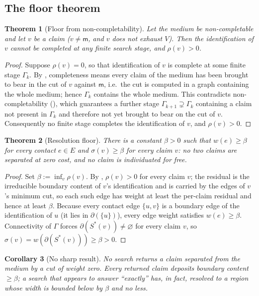 \documentclass[11pt,twocolumn,a4paper]{article}
\theoremstyle{thmstyle}
\newtheorem{theorem}{Theorem}[section]
\newtheorem{corollary}[theorem]{Corollary}
\theoremstyle{definition}
\theoremstyle{remark}
\newcommand{\Gph}{\Gamma}
\newcommand{\V}{V}
\newcommand{\E}{E}
\newcommand{\wt}{w}
\newcommand{\med}{\mathsf{m}}
\newcommand{\flo}{\beta}
\newcommand{\cut}{\partial}
\newcommand{\res}{\rho}
\newcommand{\str}{\sigma}
\begin{document}
\subsection{The floor theorem}

\begin{theorem}[Floor from non-completability]
\label{thm:floor-derived}
Let the medium be non-completable and let $v$ be a claim ($v\neq\med$, and
$v$ does not exhaust $\V$). Then the identification of $v$ cannot be
completed at any finite search stage, and $\res(v)>0$.
\end{theorem}

\begin{proof}
Suppose $\res(v)=0$, so that identification of $v$ is complete at some
finite stage $\Gph_k$. By , completeness means
every claim of the medium has been brought to bear in the cut of $v$
against $\med$, i.e.\ the cut is computed in a graph containing the whole
medium; hence $\Gph_k$ contains the whole medium. This contradicts
non-completability (), which guarantees a further
stage $\Gph_{k+1}\supsetneq\Gph_k$ containing a claim not present in
$\Gph_k$ and therefore not yet brought to bear on the cut of $v$.
Consequently no finite stage completes the identification of $v$, and
$\res(v)>0$.
\end{proof}

\begin{theorem}[Resolution floor]
\label{thm:floor}
There is a constant $\flo>0$ such that $\wt(e)\ge\flo$ for every contact
$e\in\E$ and $\str(v)\ge\flo$ for every claim $v$: no two claims are
separated at zero cost, and no claim is individuated for free.
\end{theorem}

\begin{proof}
Set $\flo:=\inf_v\res(v)$. By , $\res(v)>0$ for
every claim $v$; the residual is the irreducible boundary content of $v$'s
identification and is carried by the edges of $v$'s minimum cut, so each
such edge has weight at least the per-claim residual and hence at least
$\flo$. Because every contact edge $\{u,v\}$ is a boundary edge of the
identification of $u$ (it lies in $\cut(\{u\})$), every edge weight
satisfies $\wt(e)\ge\flo$. Connectivity of $\Gph$ forces
$\cut(S^{\ast}(v))\neq\varnothing$ for every claim $v$, so
$\str(v)=\wt(\cut(S^{\ast}(v)))\ge\flo>0$.
\end{proof}

\begin{corollary}[No sharp result]
\label{cor:no-sharp}
No search returns a claim separated from the medium by a cut of weight
zero. Every returned claim deposits boundary content $\ge\flo$; a search
that appears to answer ``exactly'' has, in fact, resolved to a region whose
width is bounded below by $\flo$ and no less.
\end{corollary}
\end{document}
